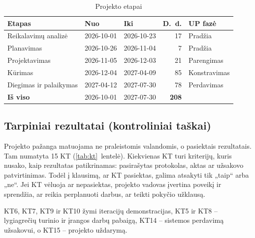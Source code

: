 \begin{table}[H]
  \centering
  \caption{Projekto etapai}
  \label{tab:etapai}
  \small
  \begin{tabular}{@{}lllrl@{}}
    \toprule
    \textbf{Etapas} & \textbf{Nuo} & \textbf{Iki} & \textbf{D.~d.} & \textbf{UP fazė} \\
    \midrule
    Reikalavimų analizė & 2026-10-01 & 2026-10-23 & 17 & Pradžia \\
    Planavimas & 2026-10-26 & 2026-11-04 & 7 & Pradžia \\
    Projektavimas & 2026-11-05 & 2026-12-03 & 21 & Parengimas \\
    Kūrimas & 2026-12-04 & 2027-04-09 & 85 & Konstravimas \\
    Diegimas ir palaikymas & 2027-04-12 & 2027-07-30 & 78 & Perdavimas \\
    \midrule
    \textbf{Iš viso} & 2026-10-01 & 2027-07-30 & \textbf{208} & \\
    \bottomrule
  \end{tabular}
\end{table}

\subsection{Tarpiniai rezultatai (kontroliniai taškai)}

Projekto pažanga matuojama ne praleistomis valandomis, o pasiektais
rezultatais. Tam numatyta 15 KT (\ref{tab:kt}~lentelė). Kiekvienas KT turi
kriterijų, kuris nusako, kaip rezultatas patikrinamas: pasirašytas
protokolas, aktas ar užsakovo patvirtinimas. Todėl į klausimą, ar KT
pasiektas, galima atsakyti tik „taip“ arba „ne“. Jei KT vėluoja ar
nepasiektas, projekto vadovas įvertina poveikį ir sprendžia, ar reikia
perplanuoti darbus, ar teikti pokyčio užklausą.

KT6, KT7, KT9 ir KT10 žymi iteracijų demonstracijas, KT5 ir KT8 –
lygiagrečių turinio ir įrangos darbų pabaigą, KT14 – sistemos perdavimą
užsakovui, o KT15 – projekto uždarymą.

